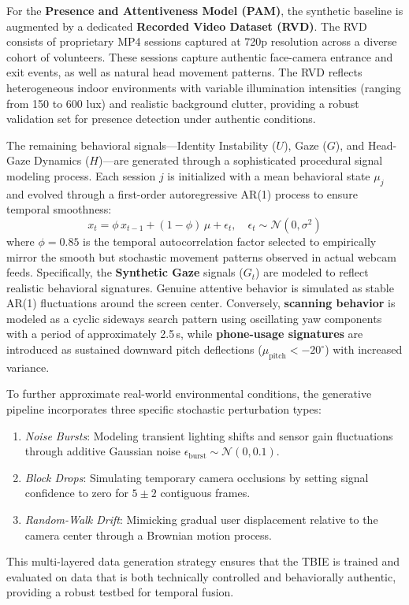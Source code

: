 \documentclass[journal]{IEEEtran}
\begin{document}
For the \textbf{Presence and Attentiveness Model (PAM)}, the synthetic baseline is augmented by a dedicated \textbf{Recorded Video Dataset (RVD)}. The RVD consists of proprietary MP4 sessions captured at 720p resolution across a diverse cohort of volunteers. These sessions capture authentic face-camera entrance and exit events, as well as natural head movement patterns. The RVD reflects heterogeneous indoor environments with variable illumination intensities (ranging from 150 to 600 lux) and realistic background clutter, providing a robust validation set for presence detection under authentic conditions.

The remaining behavioral signals---Identity Instability ($U$), Gaze ($G$), and Head-Gaze Dynamics ($H$)---are generated through a sophisticated procedural signal modeling process. Each session $j$ is initialized with a mean behavioral state $\mu_j$ and evolved through a first-order autoregressive AR(1) process to ensure temporal smoothness:
\begin{equation}
    x_t = \phi\, x_{t-1} + (1{-}\phi)\,\mu + \epsilon_t, \quad \epsilon_t \sim \mathcal{N}(0, \sigma^2)
    \label{eq:ar1}
\end{equation}
where $\phi{=}0.85$ is the temporal autocorrelation factor selected to empirically mirror the smooth but stochastic movement patterns observed in actual webcam feeds. Specifically, the \textbf{Synthetic Gaze} signals ($G_t$) are modeled to reflect realistic behavioral signatures. Genuine attentive behavior is simulated as stable AR(1) fluctuations around the screen center. Conversely, \textbf{scanning behavior} is modeled as a cyclic sideways search pattern using oscillating yaw components with a period of approximately 2.5\,s, while \textbf{phone-usage signatures} are introduced as sustained downward pitch deflections ($\mu_{\text{pitch}} < -20^\circ$) with increased variance.

To further approximate real-world environmental conditions, the generative pipeline incorporates three specific stochastic perturbation types:
\begin{enumerate}
    \item \emph{Noise Bursts}: Modeling transient lighting shifts and sensor gain fluctuations through additive Gaussian noise $\epsilon_{\text{burst}} \sim \mathcal{N}(0, 0.1)$.
    \item \emph{Block Drops}: Simulating temporary camera occlusions by setting signal confidence to zero for $5{\pm}2$ contiguous frames.
    \item \emph{Random-Walk Drift}: Mimicking gradual user displacement relative to the camera center through a Brownian motion process.
\end{enumerate}
This multi-layered data generation strategy ensures that the TBIE is trained and evaluated on data that is both technically controlled and behaviorally authentic, providing a robust testbed for temporal fusion.
\end{document}
